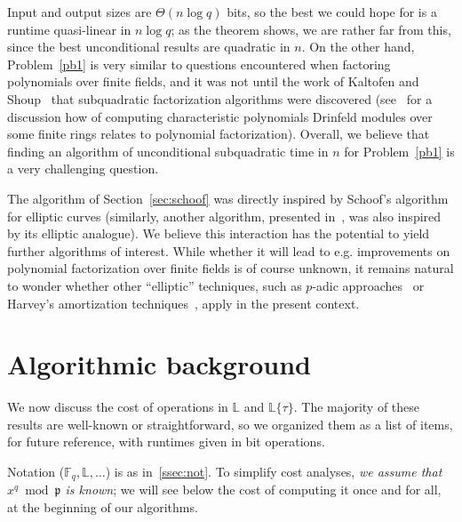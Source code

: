 \documentclass[sigconf]{acmart}
\newcommand{\F}{\mathbb{F}}
\renewcommand{\L}{\mathbb{L}}
\newcommand{\ang}[1]{\{#1\}}
\newcommand{\frakp}{\mathfrak{p}}
\begin{document}
Input and output sizes are $\Theta(n \log q)$ bits, so the best we
could hope for is a runtime quasi-linear in $n \log q$; as the theorem
shows, we are rather far from this, since the best unconditional
results are quadratic in $n$. On the other hand, Problem~\ref{pb1} is
very similar to questions encountered when factoring polynomials over
finite fields, and it was not until the work of Kaltofen and
Shoup~\cite{KaSh98} that subquadratic factorization algorithms were
discovered (see~\cite{Narayanan18} for a discussion how of computing
characteristic polynomials Drinfeld modules over some finite rings
relates to polynomial factorization).  Overall, we believe that
finding an algorithm of unconditional subquadratic time in $n$ for
Problem~\ref{pb1} is a very challenging question.

The
algorithm of Section~\ref{sec:schoof} was directly inspired by
Schoof's algorithm for elliptic curves (similarly, another algorithm,
presented in~\cite{eschost2017arXiv171200669D}, was also inspired by
its elliptic analogue). We believe this interaction has the potential
to yield further algorithms of interest. While whether it will lead to
e.g. improvements on polynomial factorization over finite fields is of
course unknown, it remains natural to wonder whether other
``elliptic'' techniques, such as $p$-adic approaches~\cite{Satoh00} or
Harvey's amortization techniques~\cite{Harvey14}, apply in the present
context.


\section{Algorithmic background}

We now discuss the cost of operations in $\L$ and $\L\ang{\tau}$. The
majority of these results are well-known or straightforward, so we
organized them as a list of items, for future reference, with runtimes
given in bit operations.

Notation ($\F_q,\L,\dots$) is as in~\ref{ssec:not}. To simplify cost
analyses, {\em we assume that $x^q \bmod \frakp$ is known}; we will
see below the cost of computing it once and for all, at the beginning
of our algorithms.


\end{document}
